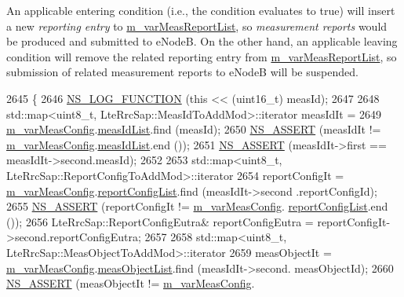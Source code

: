 An applicable entering condition (i.\+e., the condition evaluates to true) will insert a new {\itshape reporting entry} to \hyperlink{classns3_1_1LteUeRrc_a82da3c138c967761910c02b83724a0e4}{m\+\_\+var\+Meas\+Report\+List}, so {\itshape measurement reports} would be produced and submitted to e\+NodeB. On the other hand, an applicable leaving condition will remove the related reporting entry from \hyperlink{classns3_1_1LteUeRrc_a82da3c138c967761910c02b83724a0e4}{m\+\_\+var\+Meas\+Report\+List}, so submission of related measurement reports to e\+NodeB will be suspended. 
\begin{DoxyCode}
2645 \{
2646   \hyperlink{log-macros-disabled_8h_a90b90d5bad1f39cb1b64923ea94c0761}{NS\_LOG\_FUNCTION} (\textcolor{keyword}{this} << (uint16\_t) measId);
2647 
2648   std::map<uint8\_t, LteRrcSap::MeasIdToAddMod>::iterator measIdIt =
2649     \hyperlink{classns3_1_1LteUeRrc_a27a7773eedfdab964d2514d9eeb1c562}{m\_varMeasConfig}.\hyperlink{structns3_1_1LteUeRrc_1_1VarMeasConfig_aa7ad91f943892cec48ffa9a5ae872e8c}{measIdList}.find (measId);
2650   \hyperlink{assert_8h_a6dccdb0de9b252f60088ce281c49d052}{NS\_ASSERT} (measIdIt != \hyperlink{classns3_1_1LteUeRrc_a27a7773eedfdab964d2514d9eeb1c562}{m\_varMeasConfig}.\hyperlink{structns3_1_1LteUeRrc_1_1VarMeasConfig_aa7ad91f943892cec48ffa9a5ae872e8c}{measIdList}.end ());
2651   \hyperlink{assert_8h_a6dccdb0de9b252f60088ce281c49d052}{NS\_ASSERT} (measIdIt->first == measIdIt->second.measId);
2652 
2653   std::map<uint8\_t, LteRrcSap::ReportConfigToAddMod>::iterator
2654     reportConfigIt = \hyperlink{classns3_1_1LteUeRrc_a27a7773eedfdab964d2514d9eeb1c562}{m\_varMeasConfig}.\hyperlink{structns3_1_1LteUeRrc_1_1VarMeasConfig_a3ebdd65b8ad3393b5e869599e2a0afff}{reportConfigList}.find (measIdIt->second
      .reportConfigId);
2655   \hyperlink{assert_8h_a6dccdb0de9b252f60088ce281c49d052}{NS\_ASSERT} (reportConfigIt != \hyperlink{classns3_1_1LteUeRrc_a27a7773eedfdab964d2514d9eeb1c562}{m\_varMeasConfig}.
      \hyperlink{structns3_1_1LteUeRrc_1_1VarMeasConfig_a3ebdd65b8ad3393b5e869599e2a0afff}{reportConfigList}.end ());
2656   LteRrcSap::ReportConfigEutra& reportConfigEutra = reportConfigIt->second.reportConfigEutra;
2657 
2658   std::map<uint8\_t, LteRrcSap::MeasObjectToAddMod>::iterator
2659     measObjectIt = \hyperlink{classns3_1_1LteUeRrc_a27a7773eedfdab964d2514d9eeb1c562}{m\_varMeasConfig}.\hyperlink{structns3_1_1LteUeRrc_1_1VarMeasConfig_a79928885aabfe13a4d88e5d31233fac3}{measObjectList}.find (measIdIt->second.
      measObjectId);
2660   \hyperlink{assert_8h_a6dccdb0de9b252f60088ce281c49d052}{NS\_ASSERT} (measObjectIt != \hyperlink{classns3_1_1LteUeRrc_a27a7773eedfdab964d2514d9eeb1c562}{m\_varMeasConfig}.

\end{DoxyCode}
